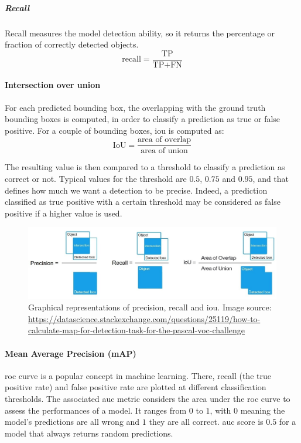 \documentclass[%
    corpo=12pt,
    twoside,
    stile=classica,   
    tipotesi=magistrale,
    evenboxes,
    english,
	numerazioneromana,
]{toptesi}
\begin{document}
\subparagraph{Recall}
Recall measures the model detection ability, so it returns the percentage or fraction of correctly detected objects.
\begin{equation}
	\text{recall} = \frac{\text{TP}}{\text{TP}+\text{FN}}
\end{equation}

\paragraph{Intersection over union}
For each predicted bounding box, the overlapping with the ground truth bounding boxes is computed, in order to classify a prediction as true or false positive. For a couple of bounding boxes, \gls{iou} is computed as:
\begin{equation}
	\text{IoU} = \frac{\text{area of overlap}}{\text{area of union}}
\end{equation}

The resulting value is then compared to a threshold to classify a prediction as correct or not. Typical values for the threshold are $0.5$, $0.75$ and $0.95$, and that defines how much we want a detection to be precise. Indeed, a prediction classified as true positive with a certain threshold may be considered as false positive if a higher value is used.

\begin{figure}[t]
	\centering
	\includegraphics[width=\linewidth]{imgs/precision_recall_iou.jpg}
	\caption[Graphical representations of precision, recall and \gls{iou}]{Graphical representations of precision, recall and \gls{iou}. Image source: \url{https://datascience.stackexchange.com/questions/25119/how-to-calculate-map-for-detection-task-for-the-pascal-voc-challenge}}
	\label{fig:iou}
\end{figure}

\paragraph{Mean Average Precision (mAP)}
\gls{roc} curve is a popular concept in machine learning. There, recall (the true positive rate) and false positive rate are plotted at different classification thresholds. The associated \gls{auc} metric considers the area under the \gls{roc} curve to assess the performances of a model\cite{roc}. It ranges from $ 0 $ to $ 1 $, with $ 0 $ meaning the model's predictions are all wrong and $ 1 $ they are all correct. \Gls{auc} score is $ 0.5 $ for a model that always returns random predictions.
\end{document}
